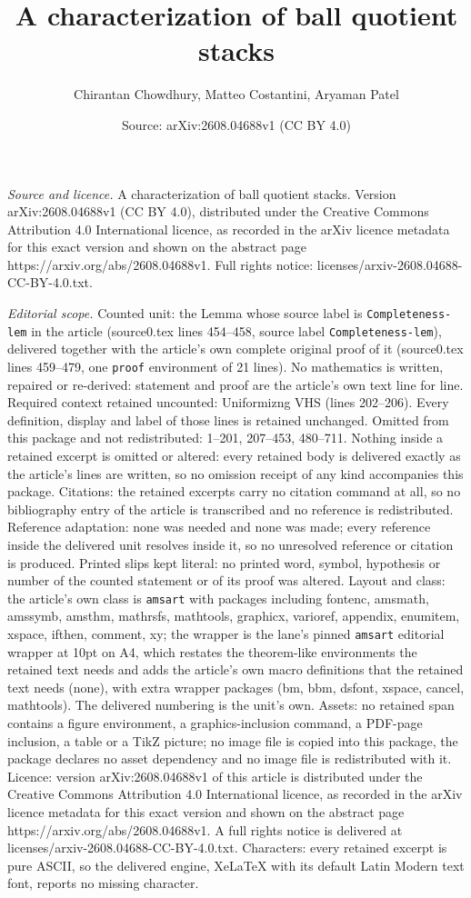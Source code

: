 \documentclass[10pt,a4paper]{amsart}
\title[A characterization of ball quotient stacks]{A characterization of ball quotient stacks}
\author{Chirantan Chowdhury, Matteo Costantini, Aryaman Patel}
\date{Source: arXiv:2608.04688v1 (CC BY 4.0)}
\begin{document}
\maketitle

\noindent\emph{Source and licence.} A characterization of ball quotient stacks. Version arXiv:2608.04688v1 (CC BY 4.0), distributed under the Creative Commons Attribution 4.0 International licence, as recorded in the arXiv licence metadata for this exact version and shown on the abstract page https://arxiv.org/abs/2608.04688v1. Full rights notice: licenses/arxiv-2608.04688-CC-BY-4.0.txt.\par\smallskip

\noindent\textit{Editorial scope.} Counted unit: the Lemma whose source label is \texttt{Completeness-lem} in the article (source0.tex lines 454--458, source label \texttt{Completeness-lem}), delivered together with the article's own complete original proof of it (source0.tex lines 459--479, one \texttt{proof} environment of 21 lines). No mathematics is written, repaired or re-derived: statement and proof are the article's own text line for line. Required context retained uncounted: Uniformizng VHS (lines 202--206). Every definition, display and label of those lines is retained unchanged. Omitted from this package and not redistributed: 1--201, 207--453, 480--711. Nothing inside a retained excerpt is omitted or altered: every retained body is delivered exactly as the article's lines are written, so no omission receipt of any kind accompanies this package. Citations: the retained excerpts carry no citation command at all, so no bibliography entry of the article is transcribed and no reference is redistributed. Reference adaptation: none was needed and none was made; every reference inside the delivered unit resolves inside it, so no unresolved reference or citation is produced. Printed slips kept literal: no printed word, symbol, hypothesis or number of the counted statement or of its proof was altered. Layout and class: the article's own class is \texttt{amsart} with packages including fontenc, amsmath, amssymb, amsthm, mathrsfs, mathtools, graphicx, varioref, appendix, enumitem, xspace, ifthen, comment, xy; the wrapper is the lane's pinned \texttt{amsart} editorial wrapper at 10pt on A4, which restates the theorem-like environments the retained text needs and adds the article's own macro definitions that the retained text needs (none), with extra wrapper packages (bm, bbm, dsfont, xspace, cancel, mathtools). The delivered numbering is the unit's own. Assets: no retained span contains a figure environment, a graphics-inclusion command, a PDF-page inclusion, a table or a TikZ picture; no image file is copied into this package, the package declares no asset dependency and no image file is redistributed with it. Licence: version arXiv:2608.04688v1 of this article is distributed under the Creative Commons Attribution 4.0 International licence, as recorded in the arXiv licence metadata for this exact version and shown on the abstract page https://arxiv.org/abs/2608.04688v1. A full rights notice is delivered at licenses/arxiv-2608.04688-CC-BY-4.0.txt. Characters: every retained excerpt is pure ASCII, so the delivered engine, XeLaTeX with its default Latin Modern text font, reports no missing character.
\end{document}
